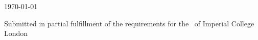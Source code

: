 \begin{titlepage}
    
    
    
    
    
    
    {\large \today} %
    
    
    \vfill %
    Submitted in partial fulfillment of the requirements for the \degreetype~of Imperial College London
    
    \end{titlepage}
    